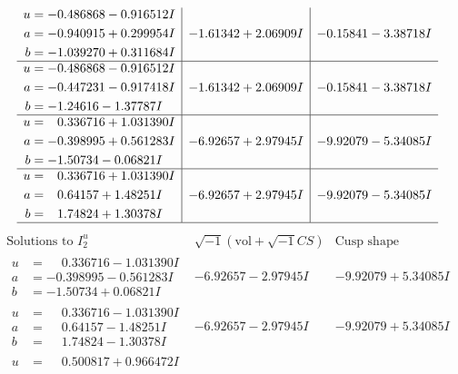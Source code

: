 \documentclass[1p]{elsarticle_modified}
\theoremstyle{definition}
\newcommand{\I}{\sqrt{-1}}
\begin{document}
$$\begin{array}{c|c|c}
\begin{aligned}
u &= -0.486868 - 0.916512 I \\
a &= -0.940915 + 0.299954 I \\
b &= -1.039270 + 0.311684 I\end{aligned}
 & -1.61342 + 2.06909 I & -0.15841 - 3.38718 I \\ \hline\begin{aligned}
u &= -0.486868 - 0.916512 I \\
a &= -0.447231 - 0.917418 I \\
b &= -1.24616 - 1.37787 I\end{aligned}
 & -1.61342 + 2.06909 I & -0.15841 - 3.38718 I \\ \hline\begin{aligned}
u &= \phantom{-}0.336716 + 1.031390 I \\
a &= -0.398995 + 0.561283 I \\
b &= -1.50734 - 0.06821 I\end{aligned}
 & -6.92657 + 2.97945 I & -9.92079 - 5.34085 I \\ \hline\begin{aligned}
u &= \phantom{-}0.336716 + 1.031390 I \\
a &= \phantom{-}0.64157 + 1.48251 I \\
b &= \phantom{-}1.74824 + 1.30378 I\end{aligned}
 & -6.92657 + 2.97945 I & -9.92079 - 5.34085 I\\
 \hline 
 \end{array}$$\newpage$$\begin{array}{c|c|c}  
\text{Solutions to }I^u_{2}& \I (\text{vol} + \sqrt{-1}CS) & \text{Cusp shape}\\
 \hline 
\begin{aligned}
u &= \phantom{-}0.336716 - 1.031390 I \\
a &= -0.398995 - 0.561283 I \\
b &= -1.50734 + 0.06821 I\end{aligned}
 & -6.92657 - 2.97945 I & -9.92079 + 5.34085 I \\ \hline\begin{aligned}
u &= \phantom{-}0.336716 - 1.031390 I \\
a &= \phantom{-}0.64157 - 1.48251 I \\
b &= \phantom{-}1.74824 - 1.30378 I\end{aligned}
 & -6.92657 - 2.97945 I & -9.92079 + 5.34085 I \\ \hline\begin{aligned}
u &= \phantom{-}0.500817 + 0.966472 I \\

\end{aligned}
\end{array}$$
\end{document}
